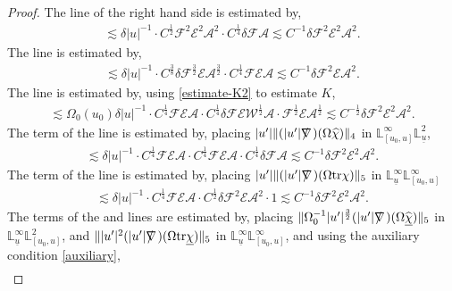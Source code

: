 \documentclass[11pt,reqno]{amsart}
\theoremstyle{definition}
\numberwithin{equation}{section}
\newcommand{\tr}{\mathrm{tr}}
\renewcommand{\L}{\mathbb{L}}
\def\chib{\underline{\chi}}
\def\chibh{\widehat{\underline{\chi}}}
\def\chih{\widehat{\chi}}
\def\tr{\mathrm{tr}}
\def\ub{\underline{u}}
\def\nablas{\mbox{$\nabla \mkern -13mu /$ }}
\begin{document}
\begin{proof}
The  line of the right hand side is estimated by, 
\begin{align*}
\lesssim\delta|u|^{-1}\cdot C^{\frac{1}{2}}\mathscr{F}^2\mathscr{E}^2\mathcal{A}^2\cdot C^{\frac{1}{4}}\delta\mathscr{F}\mathcal{A}\lesssim C^{-1}\delta\mathscr{F}^2\mathscr{E}^2\mathcal{A}^2.
\end{align*}
The  line is estimated by, \begin{align*}
\lesssim\delta|u|^{-1}\cdot C^{\frac{3}{8}}\delta\mathscr{F}^{\frac{3}{2}}\mathscr{E}\mathcal{A}^{\frac{3}{2}}\cdot C^{\frac{1}{4}}\mathscr{F}\mathscr{E}\mathcal{A} \lesssim C^{-1}\delta\mathscr{F}^2\mathscr{E}\mathcal{A}^2.
\end{align*}
The  line is estimated by, using \eqref{estimate-K2} to estimate $K$,
\begin{align*}
\lesssim\Omega_0(u_0)\delta|u|^{-1}\cdot C^{\frac{1}{4}}\mathscr{F}\mathscr{E}\mathcal{A}\cdot C^{\frac{1}{4}}\delta\mathscr{F}\mathscr{E}\mathscr{W}^\frac{1}{2}\mathcal{A}\cdot\mathscr{F}^{\frac{1}{2}}\mathscr{E}\mathcal{A}^{\frac{1}{2}}\lesssim C^{-\frac{1}{2}}\delta\mathscr{F}^2\mathscr{E}^2\mathcal{A}^2.
\end{align*}
The  term of the  line is estimated by, placing $|u'|\|(|u'|\nablas)(\Omega\chih)\|_4$ in $\L^\infty_{[u_0,u]}\L_{\ub}^2$,
\begin{align*}
\lesssim\delta|u|^{-1}\cdot C^{\frac{1}{4}}\mathscr{F}\mathscr{E}\mathcal{A}\cdot  C^{\frac{1}{4}}\mathscr{F}\mathscr{E}\mathcal{A}\cdot C^{\frac{1}{4}}\delta\mathscr{F}\mathcal{A}\lesssim C^{-1}\delta\mathscr{F}^2\mathscr{E}^2\mathcal{A}^2.
\end{align*}
The  term of the  line is estimated by, placing $|u'|\|(|u'|\nablas)(\Omega\tr\chi)\|_5$ in $\L_{\ub}^\infty\L^\infty_{[u_0,u]}$
\begin{align*}
\lesssim\delta|u|^{-1}\cdot C^{\frac{1}{4}}\mathscr{F}\mathscr{E}\mathcal{A}\cdot  C^{\frac{1}{2}}\delta\mathscr{F}^2\mathscr{E}\mathcal{A}^2\cdot 1\lesssim C^{-1}\delta\mathscr{F}^2\mathscr{E}^2\mathcal{A}^2.
\end{align*}
The  terms of the  and  lines are estimated by, placing $\|\Omega_0^{-1}|u'|^{\frac{3}{2}}(|u'|\nablas)(\Omega\chibh)\|_5$ in $\L_{\ub}^\infty\L^2_{[u_0,u]}$, and $\||u'|^2(|u'|\nablas)(\Omega\tr\chib)\|_5$ in $\L_{\ub}^\infty\L^\infty_{[u_0,u]}$, and using the auxiliary condition \eqref{auxiliary},
\begin{align*}

\end{align*}
\end{proof}
\end{document}
